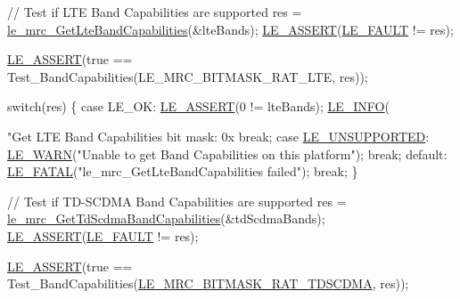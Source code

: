 \begin{DoxyCodeInclude}
{    \textcolor{comment}{// Test if LTE Band Capabilities are supported}
    res = \hyperlink{le__mrc__interface_8h_ad6b44639b1d9755b92720d5184ee2515}{le\_mrc\_GetLteBandCapabilities}(&lteBands);
    \hyperlink{le__log_8h_ac0dbbef91dc0fed449d0092ff0557b39}{LE\_ASSERT}(\hyperlink{le__basics_8h_a1cca095ed6ebab24b57a636382a6c86cac409634423b6b1ef09643529f6224798}{LE\_FAULT} != res);

    \hyperlink{le__log_8h_ac0dbbef91dc0fed449d0092ff0557b39}{LE\_ASSERT}(\textcolor{keyword}{true} == Test\_BandCapabilities(LE\_MRC\_BITMASK\_RAT\_LTE, res));

    \textcolor{keywordflow}{switch}(res)
    \{
        \textcolor{keywordflow}{case} LE\_OK:
            \hyperlink{le__log_8h_ac0dbbef91dc0fed449d0092ff0557b39}{LE\_ASSERT}(0 != lteBands);
            \hyperlink{le__log_8h_a23e6d206faa64f612045d688cdde5808}{LE\_INFO}(\textcolor{stringliteral}{"Get LTE Band Capabilities bit mask: 0x%
            \textcolor{keywordflow}{break};
        \textcolor{keywordflow}{case} \hyperlink{le__basics_8h_a1cca095ed6ebab24b57a636382a6c86ca5377262702e8434207b03533259e0c5f}{LE\_UNSUPPORTED}:
            \hyperlink{le__log_8h_a0201b2f60ee0e945479f91e181bf04b6}{LE\_WARN}(\textcolor{stringliteral}{"Unable to get Band Capabilities on this platform"});
            \textcolor{keywordflow}{break};
        \textcolor{keywordflow}{default}:
            \hyperlink{le__log_8h_a54b4b07f5396e19a8d9fca74238f4795}{LE\_FATAL}(\textcolor{stringliteral}{"le\_mrc\_GetLteBandCapabilities failed"});
            \textcolor{keywordflow}{break};
    \}

    \textcolor{comment}{// Test if TD-SCDMA Band Capabilities are supported}
    res = \hyperlink{le__mrc__interface_8h_adfa81f2361744bc67697221845713a98}{le\_mrc\_GetTdScdmaBandCapabilities}(&tdScdmaBands);
    \hyperlink{le__log_8h_ac0dbbef91dc0fed449d0092ff0557b39}{LE\_ASSERT}(\hyperlink{le__basics_8h_a1cca095ed6ebab24b57a636382a6c86cac409634423b6b1ef09643529f6224798}{LE\_FAULT} != res);

    \hyperlink{le__log_8h_ac0dbbef91dc0fed449d0092ff0557b39}{LE\_ASSERT}(\textcolor{keyword}{true} == Test\_BandCapabilities(\hyperlink{le__mrc__interface_8h_af643c7005da7f2466302eebdf7a29d93a704e1357fc74db4ae2fef1548aa18bcc}{LE\_MRC\_BITMASK\_RAT\_TDSCDMA}, 
      res));

}}
\end{DoxyCodeInclude}
